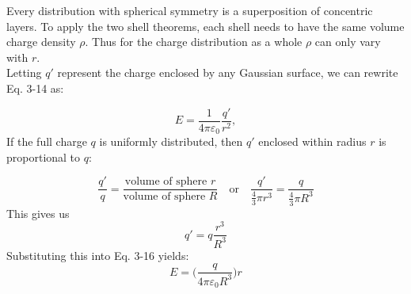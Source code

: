 \documentclass[12pt, a4paper]{article}
\begin{document}
		Every distribution with spherical symmetry is a superposition of concentric layers. To apply the two shell theorems, each shell needs to have the same volume charge density $\rho$. Thus for the charge distribution as a whole $\rho$ can only vary with $r$. \\
		Letting $q'$ represent the charge enclosed by any  Gaussian surface, we can
		rewrite Eq. 3-14 as:
		
		\begin{equation}
			E = \frac{1}{4\pi\varepsilon_0} \frac{q'}{r^2},
			\tag{(spherical distribution, field at $r \leq R$), 3-16}
		\end{equation} 
		If the full charge $q$ is uniformly distributed, then $q'$ enclosed within radius $r$ is proportional to $q$:
		
		\[
		\frac{q'}{q} = \frac{\text{volume of sphere } r}{\text{volume of sphere } R}
		\quad \text{or} \quad
		\frac{q'}{\frac{4}{3} \pi r^3} = \frac{q}{\frac{4}{3} \pi R^3} 
		\tag{3-17}
		\]
		This gives us
		\[
		q' = q \frac{r^3}{R^3}
		\tag{3-18}
		\]
		Substituting this into Eq. 3-16 yields:
		\begin{equation*}
			E = \biggl( \frac{q}{4\pi\varepsilon_0 R^3} \biggl) r
			\tag{(uniform charge, field at $r \leq R$), 3-19}
		\end{equation*}
		
\end{document}
